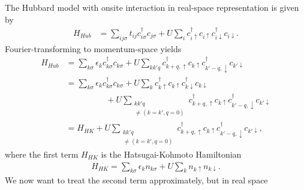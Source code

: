 \documentclass[12pt,a4paper]{scrartcl}
\numberwithin{equation}{section}
\begin{document}
The Hubbard model with onsite interaction in real-space representation is given by
\begin{align}
 H_{Hub}
 &= \sum_{i j \sigma} t_{ij} c^{\dagger}_{i\sigma} c_{j\sigma}
   + U \sum_{i} c^{\dagger}_{i\uparrow} c_{i\uparrow}  c^{\dagger}_{i\downarrow}c_{i\downarrow}.
\end{align}
Fourier-transforming to momentum-space yields
\begin{align}
 H_{Hub}
 &= \sum_{k \sigma} \epsilon_{k} c^{\dagger}_{k\sigma} c_{k\sigma}
   + U \sum_{kk'q} c^{\dagger}_{k+q,\uparrow} c_{k\uparrow}  c^{\dagger}_{k'-q,\downarrow}c_{k'\downarrow} \nonumber \\
%
&= \sum_{k \sigma} \epsilon_{k} c^{\dagger}_{k\sigma} c_{k\sigma}
   + U \sum_{k} c^{\dagger}_{k\uparrow} c_{k\uparrow}  c^{\dagger}_{k\downarrow}c_{k\downarrow} \nonumber \\
&  \hspace{2cm}  + U \sum_{\substack{kk'q \\ \neq(k=k',q=0) } } c^{\dagger}_{k+q,\uparrow} c_{k\uparrow}  c^{\dagger}_{k'-q,\downarrow}c_{k'\downarrow} \nonumber \\
%
&= H_{HK}   + U \sum_{\substack{kk'q \\ \neq(k=k',q=0) } } c^{\dagger}_{k+q,\uparrow} c_{k\uparrow}  c^{\dagger}_{k'-q,\downarrow}c_{k'\downarrow},
\end{align}
where the first term $H_{HK}$ is the Hatsugai-Kohmoto Hamiltonian
\begin{align}
 H_{HK}= \sum_{k \sigma} \epsilon_{k} n_{k\sigma}
   + U \sum_{k} n_{k\uparrow}  n_{k\downarrow}.
\end{align}
We now want to treat the second term approximately, but in real space
\end{document}
